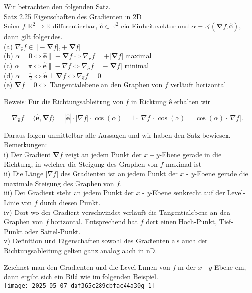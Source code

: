 \documentclass[10pt]{article}
\begin{document}
Wir betrachten den folgenden Satz.\\
Satz 2.25 Eigenschaften des Gradienten in 2D\\
Seien $f: \mathbb{R}^{2} \rightarrow \mathbb{R}$ differentierbar, $\hat{\mathbf{e}} \in \mathbb{R}^{2}$ ein Einheitsvektor und $\alpha=\measuredangle(\boldsymbol{\nabla} f ; \hat{\mathbf{e}})$, dann gilt folgendes.\\
(a) $\nabla_{\hat{\mathrm{e}}} f \in[-|\boldsymbol{\nabla} f|,+|\boldsymbol{\nabla} f|]$\\
(b) $\alpha=0 \Leftrightarrow \hat{\mathbf{e}} \|+\boldsymbol{\nabla} f \Leftrightarrow \nabla_{\hat{\mathbf{e}}} f=+|\boldsymbol{\nabla} f|$ maximal\\
(c) $\alpha=\pi \Leftrightarrow \hat{\mathbf{e}} \|-\nabla f \Leftrightarrow \nabla_{\hat{\mathbf{e}}} f=-|\boldsymbol{\nabla} f|$ minimal\\
(d) $\alpha=\frac{\pi}{2} \Leftrightarrow \hat{\mathbf{e}} \perp \boldsymbol{\nabla} f \Leftrightarrow \nabla_{\hat{\mathrm{e}}} f=0$\\
(e) $\boldsymbol{\nabla} f=0 \Leftrightarrow$ Tangentialebene an den Graphen von $f$ verläuft horizontal

Beweis: Für die Richtungsableitung von $f$ in Richtung ê erhalten wir


\begin{equation*}
\underline{\nabla_{\hat{\mathbf{e}}} f}=\langle\hat{\mathbf{e}}, \boldsymbol{\nabla} f\rangle=|\hat{\mathbf{e}}| \cdot|\nabla f| \cdot \cos (\alpha)=1 \cdot|\nabla f| \cdot \cos (\alpha)=\underline{\cos (\alpha) \cdot|\nabla f| .} \tag{2.199}
\end{equation*}


Daraus folgen unmittelbar alle Aussagen und wir haben den Satz bewiesen.\\
Bemerkungen:\\
i) Der Gradient $\boldsymbol{\nabla} f$ zeigt an jedem Punkt der $x-y$-Ebene gerade in die Richtung, in welcher die Steigung des Graphen von $f$ maximal ist.\\
ii) Die Länge $|\nabla f|$ des Gradienten ist an jedem Punkt der $x$ - $y$-Ebene gerade die maximale Steigung des Graphen von $f$.\\
iii) Der Gradient steht an jedem Punkt der $x$ - $y$-Ebene senkrecht auf der Level-Linie von $f$ durch diesen Punkt.\\
iv) Dort wo der Gradient verschwindet verläuft die Tangentialebene an den Graphen von $f$ horizontal. Entsprechend hat $f$ dort einen Hoch-Punkt, Tief-Punkt oder Sattel-Punkt.\\
v) Definition und Eigenschaften sowohl des Gradienten als auch der Richtungsableitung gelten ganz analog auch in nD.

Zeichnet man den Gradienten und die Level-Linien von $f$ in der $x$ - $y$-Ebene ein, dann ergibt sich ein Bild wie im folgenden Beispiel.\\
\texttt{[image: 2025\_05\_07\_daf365c289cbfac44a30g-1]}
\end{document}
